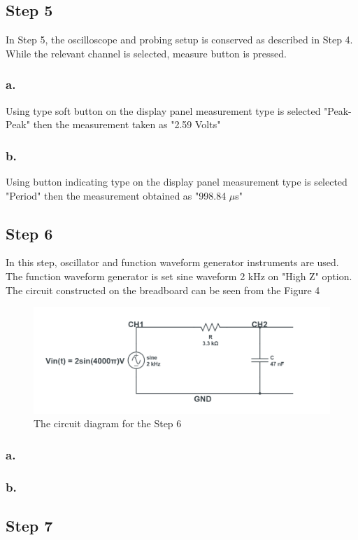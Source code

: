 \documentclass[letterpaper,12pt]{article}
\begin{document}
\subsection{Step 5}
In Step 5, the oscilloscope and probing setup is conserved as described in Step 4. While the relevant channel is selected, measure button is pressed.
\subsubsection{a.}
Using type soft  button on the display panel measurement type is selected "Peak-Peak" then the measurement taken as "2.59 Volts"
\subsubsection{b.}
Using button indicating type on the display panel measurement type is selected "Period" then the measurement obtained as "998.84 \(\mu\)s"
\subsection{Step 6}
In this step, oscillator and function waveform generator instruments are used. The function waveform generator is set sine waveform 2 kHz on "High Z" option. The circuit constructed on the breadboard can be seen from the Figure 4
\begin{figure}[h]
	\caption{The circuit diagram for the Step 6}
	\centering
	\includegraphics[width=1\textwidth]{6circuit.png}
\end{figure}

\subsubsection{a.}

\subsubsection{b.}

\subsection{Step 7}
\end{document}
